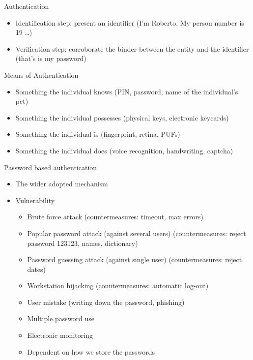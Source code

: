 \documentclass{beamer}
\begin{document}
\begin{frame}{Authentication}
  \begin{itemize}
    \item Identification step: present an identifier (I'm Roberto, My person number is 19 \dots) 
    \item Verification step: corroborate the binder between the entity and the identifier (that's is my password)
  \end{itemize}
\end{frame}

\begin{frame}{Means of Authentication}
  \begin{itemize}
    \item Something the individual knows (PIN, password, name of the individual's pet) 
    \item Something the individual possesses (physical keys, electronic keycards)
    \item Something the individual is (fingerprint, retina, PUFs)
    \item Something the individual does (voice recognition, handwriting, captcha)
  \end{itemize}
\end{frame}


\begin{frame}{Password based authentication}
  \begin{itemize}
    \item The wider adopted mechanism 
    \item Vulnerability
      \begin{itemize}
        \item Brute force attack (countermeasures: timeout, max errors)
        \item Popular password attack (against several users) (countermeasures: reject password 123123, names, dictionary)
        \item Password guessing attack (against single user) (countermeasures: reject dates)
        \item Workstation hijacking (countermeasures: automatic log-out)
        \item User mistake (writing down the password, phishing)
        \item Multiple password use
        \item Electronic monitoring 
        \item Dependent on how we store the passwords 
      \end{itemize}
  \end{itemize}
\end{frame}
\end{document}
